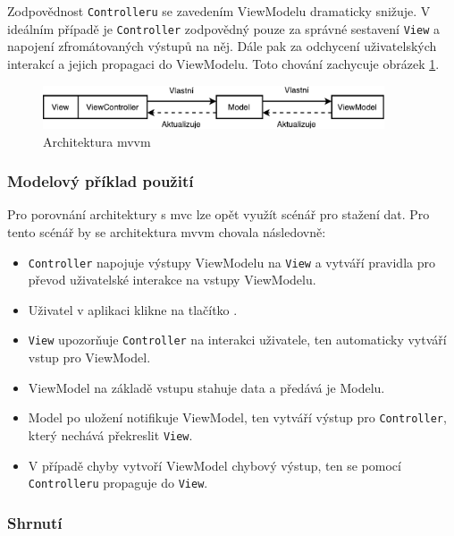
Zodpovědnost \texttt{Controlleru} se zavedením ViewModelu dramaticky snižuje.
V ideálním případě je \texttt{Controller} zodpovědný pouze za správné sestavení \texttt{View} a napojení zfromátovaných výstupů na něj.
Dále pak za odchycení uživatelských interakcí a jejich propagaci do ViewModelu.
Toto chování zachycuje obrázek \ref{architektura-mvvm}.

\begin{figure}\centering
	\includegraphics[width=0.9\textwidth]{assets/analysis-mvvm-architecture.pdf}
	\caption[Architektura \acrshort{mvvm}]{Architektura \acrshort{mvvm}}\label{architektura-mvvm}
\end{figure}

\subsubsection*{Modelový příklad použití} \label{architektura-mvvm-priklad}

Pro porovnání architektury s \acrshort{mvc} lze opět využít scénář pro stažení dat.
Pro tento scénář by se architektura \acrshort{mvvm} chovala následovně:
\begin{itemize}
  \item \texttt{Controller} napojuje výstupy ViewModelu na \texttt{View} a vytváří pravidla pro převod uživatelské interakce na vstupy ViewModelu.
  \item Uživatel v aplikaci klikne na tlačítko .
  \item \texttt{View} upozorňuje \texttt{Controller} na interakci uživatele, ten automaticky vytváří vstup pro ViewModel.
  \item ViewModel na základě vstupu stahuje data a předává je Modelu.
  \item Model po uložení notifikuje ViewModel, ten vytváří výstup pro \texttt{Controller}, který nechává překreslit \texttt{View}.
  \item V případě chyby vytvoří ViewModel chybový výstup, ten se pomocí \texttt{Controlleru} propaguje do \texttt{View}.
\end{itemize}

\subsubsection*{Shrnutí} \label{architektura-mvvm-shrnuti}

